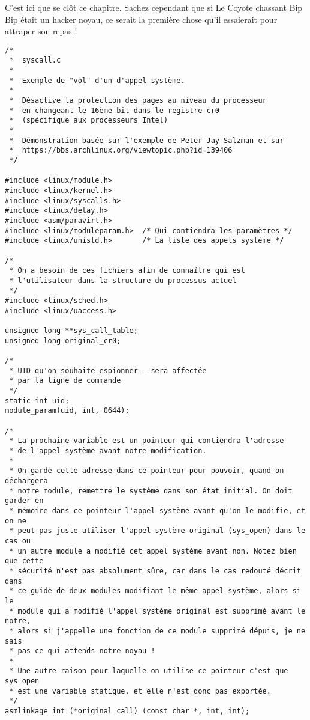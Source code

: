 \documentclass[11pt]{article}
\begin{document}
C'est ici que se clôt ce chapitre. Sachez cependant que si Le Coyote chassant Bip Bip était un hacker noyau, ce serait la première chose qu'il essaierait pour attraper son repas !

\begin{verbatim}
/*
 *  syscall.c
 *
 *  Exemple de "vol" d'un d'appel système.
 *
 *  Désactive la protection des pages au niveau du processeur
 *  en changeant le 16ème bit dans le registre cr0
 *  (spécifique aux processeurs Intel)
 *
 *  Démonstration basée sur l'exemple de Peter Jay Salzman et sur
 *  https://bbs.archlinux.org/viewtopic.php?id=139406
 */

#include <linux/module.h>
#include <linux/kernel.h>
#include <linux/syscalls.h>
#include <linux/delay.h>
#include <asm/paravirt.h>
#include <linux/moduleparam.h>  /* Qui contiendra les paramètres */
#include <linux/unistd.h>       /* La liste des appels système */

/*
 * On a besoin de ces fichiers afin de connaître qui est
 * l'utilisateur dans la structure du processus actuel
 */
#include <linux/sched.h>
#include <linux/uaccess.h>

unsigned long **sys_call_table;
unsigned long original_cr0;

/*
 * UID qu'on souhaite espionner - sera affectée
 * par la ligne de commande
 */
static int uid;
module_param(uid, int, 0644);

/*
 * La prochaine variable est un pointeur qui contiendra l'adresse
 * de l'appel système avant notre modification.
 *
 * On garde cette adresse dans ce pointeur pour pouvoir, quand on déchargera
 * notre module, remettre le système dans son état initial. On doit garder en
 * mémoire dans ce pointeur l'appel système avant qu'on le modifie, et on ne
 * peut pas juste utiliser l'appel système original (sys_open) dans le cas ou
 * un autre module a modifié cet appel système avant non. Notez bien que cette
 * sécurité n'est pas absolument sûre, car dans le cas redouté décrit dans
 * ce guide de deux modules modifiant le même appel système, alors si le
 * module qui a modifié l'appel système original est supprimé avant le notre,
 * alors si j'appelle une fonction de ce module supprimé dépuis, je ne sais
 * pas ce qui attends notre noyau !
 *
 * Une autre raison pour laquelle on utilise ce pointeur c'est que sys_open
 * est une variable statique, et elle n'est donc pas exportée.
 */
asmlinkage int (*original_call) (const char *, int, int);


\end{verbatim}
\end{document}

